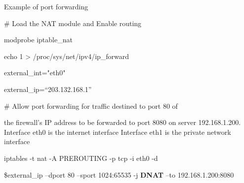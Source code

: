 \begin{frame}[t,allowframebreaks]{Example of port forwarding}
  \fontsize{15}{18}\selectfont
  \vspace{0.08cm}
  {\color{CommandGreen}\ttfamily\fontsize{13.5}{16.5}\selectfont \# Load the NAT module and Enable routing\par}
  \vspace{0.08cm}
  {\color{CommandGreen}\ttfamily\fontsize{13.5}{16.5}\selectfont modprobe iptable\_nat\par}
  \vspace{0.08cm}
  {\color{CommandGreen}\ttfamily\fontsize{13.5}{16.5}\selectfont echo 1 > /proc/sys/net/ipv4/ip\_forward\par}
  \vspace{0.08cm}
  {\color{CommandGreen}\ttfamily\fontsize{13.5}{16.5}\selectfont external\_int="eth0"\par}
  \vspace{0.08cm}
  {\color{CommandGreen}\ttfamily\fontsize{13.5}{16.5}\selectfont external\_ip=“203.132.168.1”\par}
  \vspace{0.08cm}
  {\color{CommandGreen}\ttfamily\fontsize{13.5}{16.5}\selectfont \# Allow port forwarding for traffic destined to port 80 of\par}
  the firewall's IP address to be forwarded to port 8080 on server 192.168.1.200. Interface eth0 is the internet interface Interface eth1 is the private network interface\par
  \vspace{0.08cm}
  {\color{CommandGreen}\ttfamily\fontsize{13.5}{16.5}\selectfont iptables -t nat -A PREROUTING -p tcp -i eth0 -d\par}
  \$external\_ip --dport 80 --sport 1024:65535 -j \textcolor{WarningColor}{\bfseries DNAT} --to 192.168.1.200:8080\par
\end{frame}
